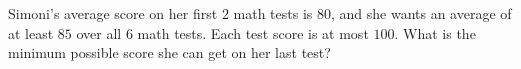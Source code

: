 Simoni's average score on her first $2$ math tests is $80$, and she wants an average of at least $85$ over all $6$ math tests. Each test score is at most $100$. What is the minimum possible score she can get on her last test?
